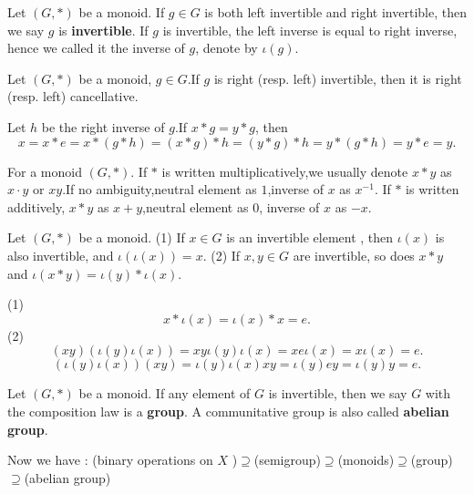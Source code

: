 \documentclass{book}
\numberwithin{equation}{section}
\begin{document}
\begin{definitionenv}
    Let $(G,*)$ be a monoid. If $g\in G$ is both left invertible and right invertible, then we say $g$ is \textbf{invertible}.
    If $g$ is invertible, the left inverse is equal to right inverse, hence we called it the inverse of $g$, denote by $\iota(g)$.
\end{definitionenv}
\begin{propositionenv}
    Let $(G,*)$ be a monoid, $g\in G$.If $g$ is right (resp. left) invertible, then it is right (resp. left) cancellative.
\end{propositionenv}
\begin{proofenv}
    Let $h$ be the right inverse of $g$.If $x*g=y*g$, then 
    $$x=x*e=x*(g*h)=(x*g)*h=(y*g)*h=y*(g*h)=y*e=y.$$
\end{proofenv}
\begin{notationenv}
    For a monoid $(G,*)$.
    \newline
    If $*$ is written multiplicatively,we usually denote $x*y$ as $x\cdot y$ or $xy$.If no ambiguity,neutral element as $1$,inverse of $x$ as $x^{-1}$.
    \newline
    If $*$ is written additively, $x*y$ as $x+y$,neutral element as $0$, inverse of $x$ as $-x$.
\end{notationenv}
\begin{propositionenv}\label{proposition5.2.4}
    Let $(G,*)$ be a monoid.
    \newline
    (1) If $x\in G$ is an invertible element , then $\iota (x)$ is also invertible, and $\iota(\iota(x))=x$.
    \newline
    (2) If $x,y\in G$ are invertible, so does $x*y$ and $\iota(x*y)=\iota(y)*\iota(x)$.
\end{propositionenv}
\begin{proofenv}
    \quad\newline
    (1) $$x*\iota(x)=\iota(x)*x=e.$$
    (2) $$(xy)(\iota(y)\iota(x))=xy\iota(y)\iota(x)=xe\iota(x)=x\iota(x)=e.$$
    $$(\iota(y)\iota(x))(xy)=\iota(y)\iota(x)xy=\iota(y)ey=\iota(y)y=e.$$
\end{proofenv}
\begin{definitionenv}
    Let $(G,*)$ be a monoid. If any element of $G$ is invertible, then we say $G$ with the composition law is a \textbf{group}. A communitative group is also called \textbf{abelian group}.
\end{definitionenv}
\begin{box2}
   Now we have : 
   \newline
   {\color{mlv} (binary operations on $X$ )$\supseteq$(semigroup)$\supseteq$(monoids)$\supseteq$(group)$\supseteq$(abelian group)}

\end{box2}
\end{document}
